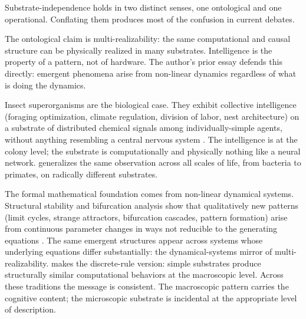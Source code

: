\documentclass[11pt]{article}
\begin{document}
Substrate-independence holds in two distinct senses, one ontological and one operational. Conflating them produces most of the confusion in current debates.

The ontological claim is multi-realizability: the same computational and causal structure can be physically realized in many substrates. Intelligence is the property of a pattern, not of hardware. The author's prior essay \citep{gavrilov_emergence_2026} defends this directly: emergent phenomena arise from non-linear dynamics regardless of what is doing the dynamics.

Insect superorganisms are the biological case. They exhibit collective intelligence (foraging optimization, climate regulation, division of labor, nest architecture) on a substrate of distributed chemical signals among individually-simple agents, without anything resembling a central nervous system \citep{holldobler_wilson_2008}. The intelligence is at the colony level; the substrate is computationally and physically nothing like a neural network. \citet{bloom2000} generalizes the same observation across all scales of life, from bacteria to primates, on radically different substrates.

The formal mathematical foundation comes from non-linear dynamical systems. Structural stability and bifurcation analysis show that qualitatively new patterns (limit cycles, strange attractors, bifurcation cascades, pattern formation) arise from continuous parameter changes in ways not reducible to the generating equations \citep{arnold_catastrophe}. The same emergent structures appear across systems whose underlying equations differ substantially: the dynamical-systems mirror of multi-realizability. \citet{wolfram2002} makes the discrete-rule version: simple substrates produce structurally similar computational behaviors at the macroscopic level. Across these traditions the message is consistent. The macroscopic pattern carries the cognitive content; the microscopic substrate is incidental at the appropriate level of description.
\end{document}
